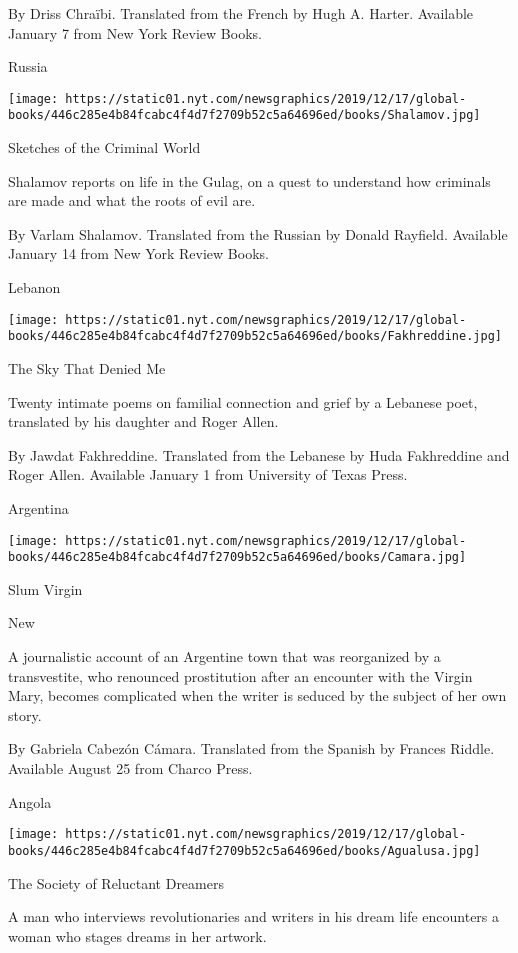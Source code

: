  By Driss Chraïbi. Translated from the French by Hugh A. Harter.
Available January 7 from New York Review Books.

Russia

\texttt{[image: https://static01.nyt.com/newsgraphics/2019/12/17/global-books/446c285e4b84fcabc4f4d7f2709b52c5a64696ed/books/Shalamov.jpg]}

Sketches of the Criminal World

Shalamov reports on life in the Gulag, on a quest to understand how
criminals are made and what the roots of evil are.

 By Varlam Shalamov. Translated from the Russian by Donald Rayfield.
Available January 14 from New York Review Books.

Lebanon

\texttt{[image: https://static01.nyt.com/newsgraphics/2019/12/17/global-books/446c285e4b84fcabc4f4d7f2709b52c5a64696ed/books/Fakhreddine.jpg]}

The Sky That Denied Me

Twenty intimate poems on familial connection and grief by a Lebanese
poet, translated by his daughter and Roger Allen.

 By Jawdat Fakhreddine. Translated from the Lebanese by Huda Fakhreddine
and Roger Allen. Available January 1 from University of Texas Press.

Argentina

\texttt{[image: https://static01.nyt.com/newsgraphics/2019/12/17/global-books/446c285e4b84fcabc4f4d7f2709b52c5a64696ed/books/Camara.jpg]}

Slum Virgin

New

A journalistic account of an Argentine town that was reorganized by a
transvestite, who renounced prostitution after an encounter with the
Virgin Mary, becomes complicated when the writer is seduced by the
subject of her own story.

 By Gabriela Cabezón Cámara. Translated from the Spanish by Frances
Riddle. Available August 25 from Charco Press.

Angola

\texttt{[image: https://static01.nyt.com/newsgraphics/2019/12/17/global-books/446c285e4b84fcabc4f4d7f2709b52c5a64696ed/books/Agualusa.jpg]}

The Society of Reluctant Dreamers

A man who interviews revolutionaries and writers in his dream life
encounters a woman who stages dreams in her artwork.


